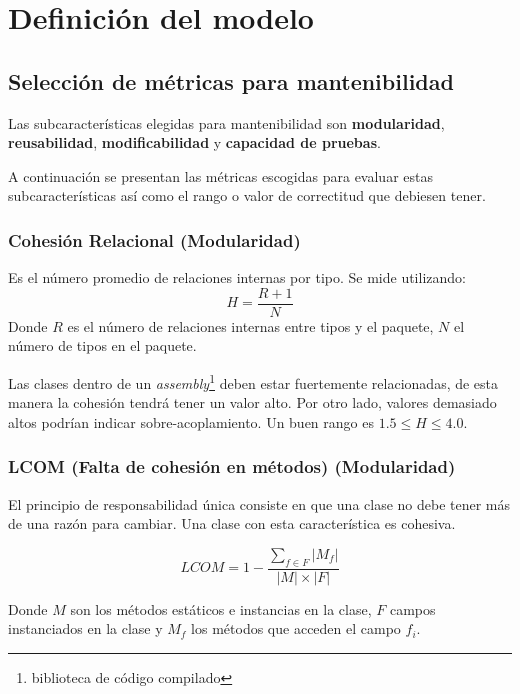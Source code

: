\section{Definición del modelo}

\subsection{Selección de métricas para mantenibilidad}
Las subcaracterísticas elegidas para mantenibilidad son \textbf{modularidad}, \textbf{reusabilidad},
\textbf{modificabilidad} y \textbf{capacidad de pruebas}.

A continuación se presentan las métricas escogidas para evaluar estas subcaracterísticas
así como el rango o valor de correctitud que debiesen tener.

\subsubsection{Cohesión Relacional (Modularidad)}
Es el número promedio de relaciones internas por tipo. Se mide utilizando:
\begin{equation*}
H=\frac{R+1}{N}
\end{equation*}
Donde $R$ es el número de relaciones internas entre tipos y el paquete, $N$ el número de tipos en el paquete.

Las clases dentro de un \textit{assembly}\footnote{biblioteca de código compilado} deben estar fuertemente 
relacionadas, de esta manera la cohesión tendrá tener un valor alto. Por otro lado, valores demasiado altos 
podrían indicar sobre-acoplamiento. Un buen rango es $1.5\leq H\leq 4.0$.

\subsubsection{LCOM (Falta de cohesión en métodos) (Modularidad)}
El principio de responsabilidad única consiste en que una clase no debe tener más de una razón para cambiar. 
Una clase con esta característica es cohesiva.

\begin{equation*}
LCOM = 1 - \frac{\sum_{f\in F}\left|M_f\right|}{\left|M\right|\times\left|F\right|}
\end{equation*}

Donde $M$ son los métodos estáticos e instancias en la clase, $F$ campos instanciados en la clase y $M_f$ 
los métodos que acceden el campo $f_i$.


